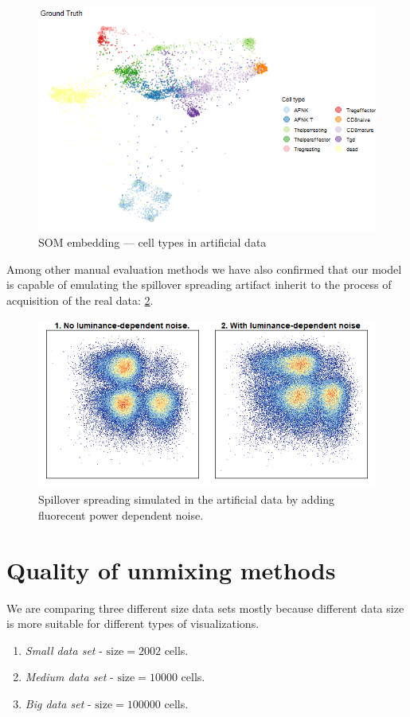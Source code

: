 \begin{figure}
  \includegraphics[width=1.0\linewidth]{img/SOM_types2.png}
  \caption{SOM embedding --- cell types in artificial data}
  \label{fig:SOM_tps}
\end{figure}

Among other manual evaluation methods we have also confirmed that our model is capable of emulating the spillover spreading artifact inherit to the process of acquisition of the real data: \cref{fig:spills}.

\begin{figure}
  \includegraphics[width=1.0\linewidth]{img/spill.png}
  \caption{Spillover spreading simulated in the artificial data by adding fluorecent power dependent noise.}
  \label{fig:spills}
\end{figure}

\section{Quality of unmixing methods}
We are comparing three different size data sets mostly because different data size is more suitable for different types of visualizations. 
\begin{enumerate}
    \item \emph{Small data set} - $\text{size}=2002$ cells.
    \item \emph{Medium data set} - $\text{size}=10000$ cells.
    \item \emph{Big data set} - $\text{size}=100000$ cells.
\end{enumerate}

